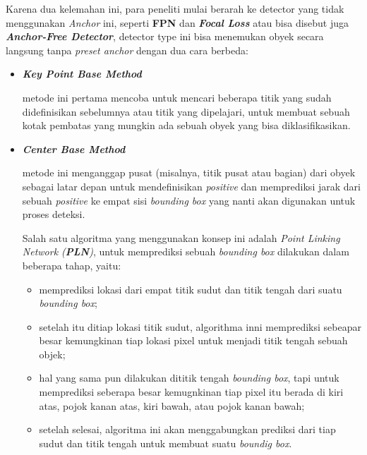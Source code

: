\documentclass[a4paper]{article}
\begin{document}
\begin{enumerate}
    
    Karena dua kelemahan ini, para peneliti mulai berarah ke detector yang tidak menggunakan \textit{Anchor} ini, seperti \textbf{FPN} dan \textbf{\textit{Focal Loss}} atau bisa disebut juga \textbf{\textit{Anchor-Free Detector}}\autocite{Zhang_2020_CVPR}, detector type ini bisa menemukan obyek secara langsung tanpa \textit{preset anchor} dengan dua cara berbeda:

    \begin{itemize}
        \item \textbf{\textit{Key Point Base Method}}

            metode ini pertama mencoba untuk mencari beberapa titik yang sudah didefinisikan sebelumnya atau titik yang dipelajari, untuk membuat sebuah kotak pembatas yang mungkin ada sebuah obyek yang bisa diklasifikasikan\autocite{DBLP:journals/corr/abs-1904-03797}.

        \item \textbf{\textit{Center Base Method}}

            metode ini menganggap pusat (misalnya, titik pusat atau bagian) dari obyek sebagai latar depan untuk mendefinisikan \textit{positive} dan memprediksi jarak dari sebuah \textit{positive} ke empat sisi \textit{bounding box} yang nanti akan digunakan untuk proses deteksi\autocite{Zhang_2020_CVPR}.


            Salah satu algoritma yang menggunakan konsep ini adalah \textit{Point Linking Network (\textbf{PLN})}, untuk memprediksi sebuah \textit{bounding box} dilakukan dalam beberapa tahap, yaitu:

            \begin{itemize}
                \item memprediksi lokasi dari empat titik sudut dan titik tengah dari suatu \textit{bounding box};
                \item setelah itu ditiap lokasi titik sudut, algorithma inni memprediksi sebeapar besar kemungkinan tiap lokasi pixel untuk menjadi titik tengah sebuah objek;
                \item hal yang sama pun dilakukan dititik tengah \textit{bounding box}, tapi untuk memprediksi seberapa besar kemugnkinan tiap pixel itu berada di kiri atas, pojok kanan atas, kiri bawah, atau pojok kanan bawah;
                \item setelah selesai, algoritma ini akan menggabungkan prediksi dari tiap sudut dan titik tengah untuk membuat suatu \textit{boundig box}\autocite{DBLP:journals/corr/abs-1808-01244}.
            \end{itemize}


\end{itemize}
\end{enumerate}
\end{document}

